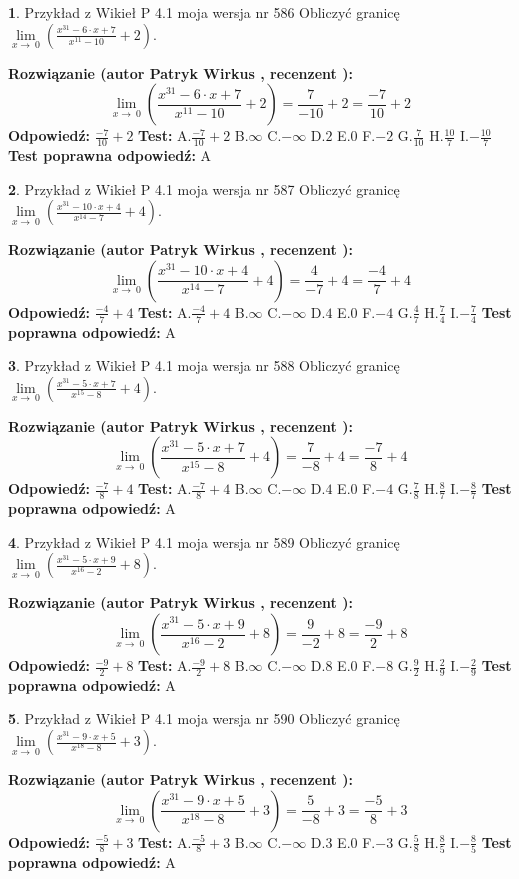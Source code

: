 \documentclass[12pt, a4paper]{article}
\theoremstyle{definition} %
\newtheorem{zad}{}
\newcommand{\zadStart}[1]{\begin{zad}#1\newline}
\newcommand{\zadStop}{\end{zad}}
\newcommand{\rozwStart}[2]{\noindent \textbf{Rozwiązanie (autor #1 , recenzent #2): }\newline}
\newcommand{\rozwStop}{\newline}
\newcommand{\odpStart}{\noindent \textbf{Odpowiedź:}\newline}
\newcommand{\odpStop}{\newline}
\newcommand{\testStart}{\noindent \textbf{Test:}\newline}
\newcommand{\testStop}{\newline}
\newcommand{\kluczStart}{\noindent \textbf{Test poprawna odpowiedź:}\newline}
\newcommand{\kluczStop}{\newline}
\begin{document}
\zadStart{Przykład z Wikieł P 4.1 moja wersja nr 586}
Obliczyć granicę $\lim\limits_{x\to\ 0}(\frac{x^{31}-6 \cdot x +7}{x^{11}-10}+2)$.
\zadStop
\rozwStart{Patryk Wirkus}{}
$$\lim\limits_{x\to\ 0}(\frac{x^{31}-6 \cdot x +7}{x^{11}-10}+2)=\frac{7}{-10}+2=\frac{-7}{10}+2$$
\rozwStop
\odpStart
$\frac{-7}{10}+2$
\odpStop
\testStart
A.$\frac{-7}{10}+2$
B.$\infty$
C.$-\infty$
D.$2$
E.$0$
F.$-2$
G.$\frac{7}{10}$
H.$\frac{10}{7}$
I.$-\frac{10}{7}$
\testStop
\kluczStart
A
\kluczStop



\zadStart{Przykład z Wikieł P 4.1 moja wersja nr 587}
Obliczyć granicę $\lim\limits_{x\to\ 0}(\frac{x^{31}-10 \cdot x +4}{x^{14}-7}+4)$.
\zadStop
\rozwStart{Patryk Wirkus}{}
$$\lim\limits_{x\to\ 0}(\frac{x^{31}-10 \cdot x +4}{x^{14}-7}+4)=\frac{4}{-7}+4=\frac{-4}{7}+4$$
\rozwStop
\odpStart
$\frac{-4}{7}+4$
\odpStop
\testStart
A.$\frac{-4}{7}+4$
B.$\infty$
C.$-\infty$
D.$4$
E.$0$
F.$-4$
G.$\frac{4}{7}$
H.$\frac{7}{4}$
I.$-\frac{7}{4}$
\testStop
\kluczStart
A
\kluczStop



\zadStart{Przykład z Wikieł P 4.1 moja wersja nr 588}
Obliczyć granicę $\lim\limits_{x\to\ 0}(\frac{x^{31}-5 \cdot x +7}{x^{15}-8}+4)$.
\zadStop
\rozwStart{Patryk Wirkus}{}
$$\lim\limits_{x\to\ 0}(\frac{x^{31}-5 \cdot x +7}{x^{15}-8}+4)=\frac{7}{-8}+4=\frac{-7}{8}+4$$
\rozwStop
\odpStart
$\frac{-7}{8}+4$
\odpStop
\testStart
A.$\frac{-7}{8}+4$
B.$\infty$
C.$-\infty$
D.$4$
E.$0$
F.$-4$
G.$\frac{7}{8}$
H.$\frac{8}{7}$
I.$-\frac{8}{7}$
\testStop
\kluczStart
A
\kluczStop



\zadStart{Przykład z Wikieł P 4.1 moja wersja nr 589}
Obliczyć granicę $\lim\limits_{x\to\ 0}(\frac{x^{31}-5 \cdot x +9}{x^{16}-2}+8)$.
\zadStop
\rozwStart{Patryk Wirkus}{}
$$\lim\limits_{x\to\ 0}(\frac{x^{31}-5 \cdot x +9}{x^{16}-2}+8)=\frac{9}{-2}+8=\frac{-9}{2}+8$$
\rozwStop
\odpStart
$\frac{-9}{2}+8$
\odpStop
\testStart
A.$\frac{-9}{2}+8$
B.$\infty$
C.$-\infty$
D.$8$
E.$0$
F.$-8$
G.$\frac{9}{2}$
H.$\frac{2}{9}$
I.$-\frac{2}{9}$
\testStop
\kluczStart
A
\kluczStop



\zadStart{Przykład z Wikieł P 4.1 moja wersja nr 590}
Obliczyć granicę $\lim\limits_{x\to\ 0}(\frac{x^{31}-9 \cdot x +5}{x^{18}-8}+3)$.
\zadStop
\rozwStart{Patryk Wirkus}{}
$$\lim\limits_{x\to\ 0}(\frac{x^{31}-9 \cdot x +5}{x^{18}-8}+3)=\frac{5}{-8}+3=\frac{-5}{8}+3$$
\rozwStop
\odpStart
$\frac{-5}{8}+3$
\odpStop
\testStart
A.$\frac{-5}{8}+3$
B.$\infty$
C.$-\infty$
D.$3$
E.$0$
F.$-3$
G.$\frac{5}{8}$
H.$\frac{8}{5}$
I.$-\frac{8}{5}$
\testStop
\kluczStart
A
\kluczStop
\end{document}
